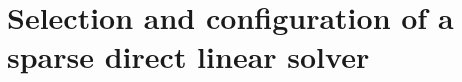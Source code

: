 \chapter{Selection and configuration of a sparse direct linear solver}
\label{chapter:solver configuration}



%

%

%

%

%

%
























%